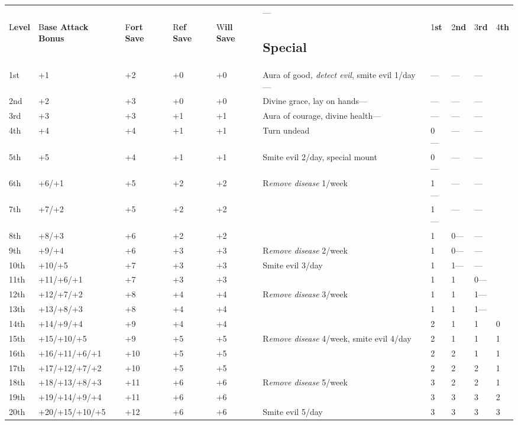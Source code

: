 \documentclass{article}
\begin{document}
\vspace{12pt}
\begin{tabular}{|>{\raggedright}p{17pt}|>{\raggedright}p{43pt}|>{\raggedright}p{13pt}|>{\raggedright}p{14pt}|>{\raggedright}p{15pt}|>{\raggedright}p{80pt}|>{\raggedright}p{10pt}|>{\raggedright}p{12pt}|>{\raggedright}p{11pt}|>{\raggedright}p{11pt}|}
\hline
\multicolumn{10}{|p{230pt}|}{T\textbf{able: The Paladin}}\tabularnewline
\hline
 &  &  &  &  & --- & \multicolumn{4}{p{45pt}|}{ \textbf{Spells per Day ---}}\tabularnewline
\hline
L\textbf{evel} & B\textbf{ase Attack Bonus} & F\textbf{ort Save} & R\textbf{ef 
Save} & W\textbf{ill Save} & \subsection*{S\textbf{pecial}} & 1\textbf{st} & 2\textbf{nd} & 3\textbf{rd} & 4\textbf{th}\tabularnewline
\hline
1st & +1 & +2 & +0 & +0 & Aura of good\textit{, detect evil}, \linebreak{}
smite evil 1/day--- & --- & --- & --- & \tabularnewline
\hline
2nd & +2 & +3 & +0 & +0 & Divine grace, lay on hands--- & --- & --- & --- & \tabularnewline
\hline
3rd & +3 & +3 & +1 & +1 & Aura of courage, divine health--- & --- & --- & --- & \tabularnewline
\hline
4th & +4 & +4 & +1 & +1 & Turn undead & 0--- & --- & --- & \tabularnewline
\hline
5th & +5 & +4 & +1 & +1 & Smite evil 2/day, special mount & 0--- & --- & --- & \tabularnewline
\hline
6th & +6/+1 & +5 & +2 & +2 & R\textit{emove disease }1/week & 1--- & --- & --- & \tabularnewline
\hline
7th & +7/+2 & +5 & +2 & +2 &  & 1--- & --- & --- & \tabularnewline
\hline
8th & +8/+3 & +6 & +2 & +2 &  & 1 & 0--- & --- & \tabularnewline
\hline
9th & +9/+4 & +6 & +3 & +3 & R\textit{emove disease }2/week & 1 & 0--- & --- & \tabularnewline
\hline
10th & +10/+5 & +7 & +3 & +3 & Smite evil 3/day & 1 & 1--- & --- & \tabularnewline
\hline
11th & +11/+6/+1 & +7 & +3 & +3 &  & 1 & 1 & 0--- & \tabularnewline
\hline
12th & +12/+7/+2 & +8 & +4 & +4 & R\textit{emove disease }3/week & 1 & 1 & 1--- & \tabularnewline
\hline
13th & +13/+8/+3 & +8 & +4 & +4 &  & 1 & 1 & 1--- & \tabularnewline
\hline
14th & +14/+9/+4 & +9 & +4 & +4 &  & 2 & 1 & 1 & 0\tabularnewline
\hline
15th & +15/+10/+5 & +9 & +5 & +5 & R\textit{emove disease }4/week, \linebreak{}
smite evil 4/day & 2 & 1 & 1 & 1\tabularnewline
\hline
16th & +16/+11/+6/+1 & +10 & +5 & +5 &  & 2 & 2 & 1 & 1\tabularnewline
\hline
17th & +17/+12/+7/+2 & +10 & +5 & +5 &  & 2 & 2 & 2 & 1\tabularnewline
\hline
18th & +18/+13/+8/+3 & +11 & +6 & +6 & R\textit{emove disease }5/week & 3 & 2 & 2 & 1\tabularnewline
\hline
19th & +19/+14/+9/+4 & +11 & +6 & +6 &  & 3 & 3 & 3 & 2\tabularnewline
\hline
20th & +20/+15/+10/+5 & +12 & +6 & +6 & Smite evil 5/day & 3 & 3 & 3 & 3\tabularnewline
\hline
\end{tabular}
\end{document}
